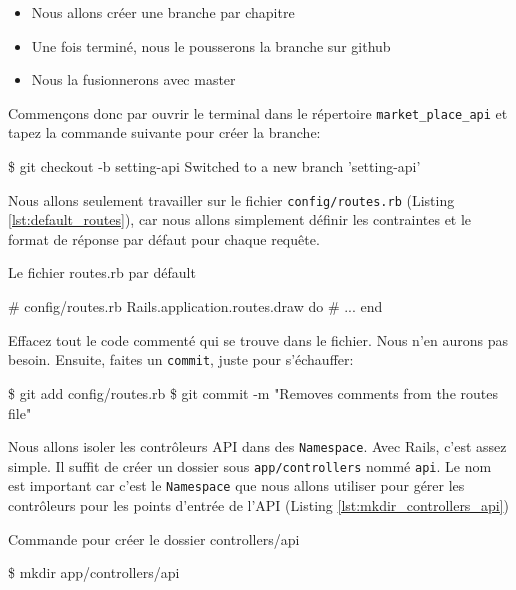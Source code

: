 \documentclass[]{report}
\begin{document}
      \begin{itemize}
        \item Nous allons créer une branche par chapitre
        \item Une fois terminé, nous le pousserons la branche sur github
        \item Nous la fusionnerons avec master
      \end{itemize}

      Commençons donc par ouvrir le terminal dans le répertoire \verb|market_place_api| et tapez la commande suivante pour créer la branche:

      \begin{bashcode}
      \$ git checkout -b setting-api
      Switched to a new branch 'setting-api'
      \end{bashcode}

      Nous allons seulement travailler sur le fichier \verb|config/routes.rb| (Listing \ref{lst:default_routes}), car nous allons simplement définir les contraintes et le format de réponse par défaut pour chaque requête.

      \begin{listing}
        \caption{Le fichier routes.rb par défault}
        \label{lst:default_routes}
        \begin{rubycode}[language=ruby]
        # config/routes.rb
        Rails.application.routes.draw do
          # ...
        end
        \end{rubycode}
      \end{listing}

      Effacez tout le code commenté qui se trouve dans le fichier. Nous n'en aurons pas besoin. Ensuite, faites un \verb|commit|, juste pour s'échauffer:

      \begin{bashcode}
      \$ git add config/routes.rb
      \$ git commit -m "Removes comments from the routes file"
      \end{bashcode}

      Nous allons isoler les contrôleurs API dans des \verb|Namespace|. Avec Rails, c'est assez simple. Il suffit de créer un dossier sous \verb|app/controllers| nommé \verb|api|. Le nom est important car c'est le \verb|Namespace| que nous allons utiliser pour gérer les contrôleurs pour les points d'entrée de l'API (Listing \ref{lst:mkdir_controllers_api})

      \begin{listing}
        \caption{Commande pour créer le dossier controllers/api}
        \label{lst:mkdir_controllers_api}
        \begin{bashcode}[language=bash, ]
        \$ mkdir app/controllers/api
        \end{bashcode}
      \end{listing}
\end{document}
